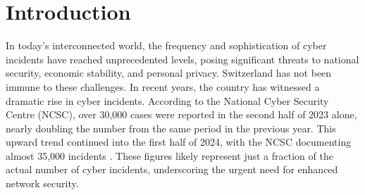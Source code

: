 \chapter{Introduction}
\label{ch:introduction}





In today's interconnected world, the frequency and sophistication of cyber incidents have reached unprecedented levels, posing significant threats to national security, economic stability, and personal privacy.
Switzerland has not been immune to these challenges.
In recent years, the country has witnessed a dramatic rise in cyber incidents.
According to the National Cyber Security Centre (NCSC), over 30,000 cases were reported in the second half of 2023 alone, nearly doubling the number from the same period in the previous year.
This upward trend continued into the first half of 2024, with the NCSC documenting almost 35,000 incidents \cite{HomepageNCSC}.
These figures likely represent just a fraction of the actual number of cyber incidents, underscoring the urgent need for enhanced network security.

